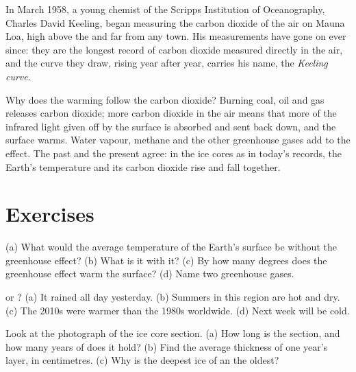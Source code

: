 \begin{history}
In March 1958, a young chemist of the Scripps Institution of
Oceanography, Charles David Keeling, began measuring the carbon dioxide
of the air on Mauna Loa, high above the  and far from any town. His
measurements have gone on ever since: they are the longest record of
carbon dioxide measured directly in the air, and the curve they draw,
rising year after year, carries his name, the \emph{Keeling curve}.
\end{history}

Why does the warming follow the carbon dioxide? Burning coal, oil and gas
releases carbon dioxide; more carbon dioxide in the air means that more
of the infrared light given off by the surface is absorbed and sent back
down, and the surface warms. Water vapour, methane and the other
greenhouse gases add to the effect. The past and the present agree: in the
ice cores as in today's records, the Earth's temperature and its carbon
dioxide rise and fall together.

\section{Exercises}

\begin{exercise}[$\star$]\label{exo:g9:climate-past-and-present:1}
(a) What would the average temperature of the Earth's surface be without
the greenhouse effect? (b) What is it with it? (c) By how many degrees
does the greenhouse effect warm the surface? (d) Name two greenhouse
gases.
\end{exercise}

\begin{exercise}[$\star$]\label{exo:g9:climate-past-and-present:2}
 or ? (a) It rained all day yesterday. (b) Summers in this
region are hot and dry. (c) The 2010s were warmer than the 1980s
worldwide. (d) Next week will be cold.
\end{exercise}

\begin{exercise}[$\star$]\label{exo:g9:climate-past-and-present:3}
Look at the photograph of the ice core section. (a) How long is the
section, and how many years of  does it hold? (b) Find the average
thickness of one year's layer, in centimetres. (c) Why is the deepest
ice of an  the oldest?
\end{exercise}

